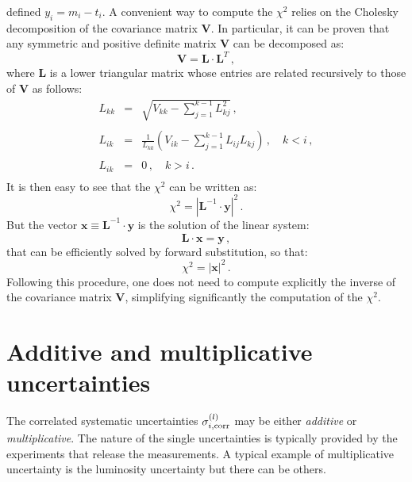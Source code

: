 \documentclass[10pt,a4paper]{article}
\begin{document}
defined $y_i = m_i-t_i$. A convenient way to compute the $\chi^2$
relies on the Cholesky decomposition of the covariance matrix
$\mathbf{V}$. In particular, it can be proven that any symmetric and
positive definite matrix $\mathbf{V}$ can be decomposed as:
\begin{equation}\label{eq:choleskydec}
\mathbf{V} = \mathbf{L}\cdot\mathbf{L}^{T}\,,
\end{equation}
where $\mathbf{L}$ is a lower triangular matrix whose entries are
related recursively to those of $\mathbf{V}$ as follows:
\begin{equation}\label{eq:cholalg}
\begin{array}{rcl}
  L_{kk} &=&\displaystyle \sqrt{V_{kk}-\sum_{j=1}^{k-1}L_{kj}^2}\,,\\
  \\
  L_{ik} &=&\displaystyle
             \frac{1}{L_{kk}}\left(V_{ik}-\sum_{j=1}^{k-1}L_{ij}L_{kj}\right)\,,\quad
             k < i\,,\\
\\
  L_{ik} &=&\displaystyle 0\,,\quad
             k > i\,.\\
\end{array}
\end{equation}
It is then easy to see that the $\chi^2$ can be written as:
\begin{equation}
\chi^2 = \left|\mathbf{L}^{-1}\cdot \mathbf{y}\right|^2\,.
\end{equation}
But the vector $\mathbf{x} \equiv \mathbf{L}^{-1}\cdot \mathbf{y}$ is
the solution of the linear system:
\begin{equation}
  \mathbf{L} \cdot \mathbf{x} = \mathbf{y}\,,
\end{equation}
that can be efficiently solved by forward substitution, so that:
\begin{equation}
  \chi^2 = \left|\mathbf{x}\right|^2\,.
\end{equation}
Following this procedure, one does not need to compute explicitly the
inverse of the covariance matrix $\mathbf{V}$, simplifying
significantly the computation of the $\chi^2$.

\section{Additive and multiplicative uncertainties}

The correlated systematic uncertainties $\sigma_{i,\rm corr}^{(l)}$
may be either \textit{additive} or \textit{multiplicative}. The nature
of the single uncertainties is typically provided by the experiments
that release the measurements. A typical example of multiplicative
uncertainty is the luminosity uncertainty but there can be others.
\end{document}
